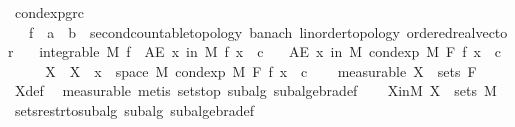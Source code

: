 \begin{isabellebody}
%
\endisatagdocument
{\isafolddocument}%
%
\isadelimdocument
%
\endisadelimdocument
{}\isamarkupfalse%
\ cond{\isacharunderscore}{\kern0pt}exp{\isacharunderscore}{\kern0pt}gr{\isacharunderscore}{\kern0pt}c{\isacharcolon}{\kern0pt}\isanewline
\ \ \ f\ {\isacharcolon}{\kern0pt}{\isacharcolon}{\kern0pt}\ {\isachardoublequoteopen}{\isacharprime}{\kern0pt}a\ {\isasymRightarrow}\ {\isacharprime}{\kern0pt}b\ {\isacharcolon}{\kern0pt}{\isacharcolon}{\kern0pt}\ {\isacharbraceleft}{\kern0pt}second{\isacharunderscore}{\kern0pt}countable{\isacharunderscore}{\kern0pt}topology{\isacharcomma}{\kern0pt}\ banach{\isacharcomma}{\kern0pt}\ linorder{\isacharunderscore}{\kern0pt}topology{\isacharcomma}{\kern0pt}\ ordered{\isacharunderscore}{\kern0pt}real{\isacharunderscore}{\kern0pt}vector{\isacharbraceright}{\kern0pt}{\isachardoublequoteclose}\isanewline
\ \ \ {\isachardoublequoteopen}integrable\ M\ f{\isachardoublequoteclose}\ \ {\isachardoublequoteopen}AE\ x\ in\ M{\isachardot}{\kern0pt}\ f\ x\ {\isachargreater}{\kern0pt}\ c{\isachardoublequoteclose}\isanewline
\ \ \ {\isachardoublequoteopen}AE\ x\ in\ M{\isachardot}{\kern0pt}\ cond{\isacharunderscore}{\kern0pt}exp\ M\ F\ f\ x\ {\isachargreater}{\kern0pt}\ c{\isachardoublequoteclose}\isanewline
%
\isadelimproof
%
\endisadelimproof
%
\isatagproof
{}\isamarkupfalse%
\ {\isacharminus}{\kern0pt}\isanewline
\ \ \isamarkupfalse%
\ X\ \ {\isachardoublequoteopen}X\ {\isacharequal}{\kern0pt}\ {\isacharbraceleft}{\kern0pt}x\ {\isasymin}\ space\ M{\isachardot}{\kern0pt}\ cond{\isacharunderscore}{\kern0pt}exp\ M\ F\ f\ x\ {\isasymle}\ c{\isacharbraceright}{\kern0pt}{\isachardoublequoteclose}\isanewline
\ \ \isamarkupfalse%
\ {\isacharbrackleft}{\kern0pt}measurable{\isacharbrackright}{\kern0pt}{\isacharcolon}{\kern0pt}\ {\isachardoublequoteopen}X\ {\isasymin}\ sets\ F{\isachardoublequoteclose}\ \isamarkupfalse%
\ X{\isacharunderscore}{\kern0pt}def\ \isamarkupfalse%
\ measurable\ {\isacharparenleft}{\kern0pt}metis\ sets{\isachardot}{\kern0pt}top\ subalg\ subalgebra{\isacharunderscore}{\kern0pt}def{\isacharparenright}{\kern0pt}\isanewline
\ \ \isamarkupfalse%
\ X{\isacharunderscore}{\kern0pt}in{\isacharunderscore}{\kern0pt}M{\isacharcolon}{\kern0pt}\ {\isachardoublequoteopen}X\ {\isasymin}\ sets\ M{\isachardoublequoteclose}\ \isamarkupfalse%
\ sets{\isacharunderscore}{\kern0pt}restr{\isacharunderscore}{\kern0pt}to{\isacharunderscore}{\kern0pt}subalg\ subalg\ subalgebra{\isacharunderscore}{\kern0pt}def\ \isamarkupfalse%

\end{isabellebody}
